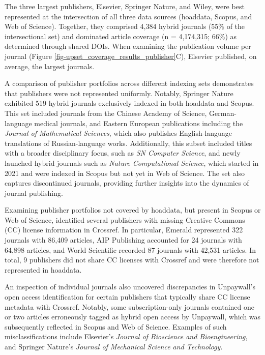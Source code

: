 \documentclass[a4paper,man,floatsintext,longtable,noextraspace,10pt]{apa6}
\begin{document}
The three largest publishers, Elsevier, Springer Nature, and Wiley, were
best represented at the intersection of all three data sources
(hoaddata, Scopus, and Web of Science). Together, they comprised 4,384
hybrid journals (55\% of the intersectional set) and dominated article
coverage (n = 4,174,315; 66\%) as determined through shared DOIs. When
examining the publication volume per journal (Figure
\ref{fig-upset_coverage_results_publisher}C), Elsevier published, on
average, the largest journals.

A comparison of publisher portfolios across different indexing sets
demonstrates that publishers were not represented uniformly. Notably,
Springer Nature exhibited 519 hybrid journals exclusively indexed in
both hoaddata and Scopus. This set included journals from the Chinese
Academy of Science, German-language medical journals, and Eastern
European publications including the \emph{Journal of Mathematical
Sciences}, which also publishes English-language translations of
Russian-language works. Additionally, this subset included titles with a
broader disciplinary focus, such as \emph{SN Computer Science}, and
newly launched hybrid journals such as \emph{Nature Computational
Science}, which started in 2021 and were indexed in Scopus but not yet
in Web of Science. The set also captures discontinued journals,
providing further insights into the dynamics of journal publishing.

Examining publisher portfolios not covered by hoaddata, but present in
Scopus or Web of Science, identified several publishers with missing
Creative Commons (CC) license information in Crossref. In particular,
Emerald represented 322 journals with 86,409 articles, AIP Publishing
accounted for 24 journals with 64,898 articles, and World Scientific
recorded 87 journals with 42,531 articles. In total, 9 publishers did
not share CC licenses with Crossref and were therefore not represented
in hoaddata.

An inspection of individual journals also uncovered discrepancies in
Unpaywall's open access identification for certain publishers that
typically share CC license metadata with Crossref. Notably, some
subscription-only journals contained one or two articles erroneously
tagged as hybrid open access by Unpaywall, which was subsequently
reflected in Scopus and Web of Science. Examples of such
misclassifications include Elsevier's \emph{Journal of Bioscience and
Bioengineering}, and Springer Nature's \emph{Journal of Mechanical
Science and Technology}.
\end{document}
